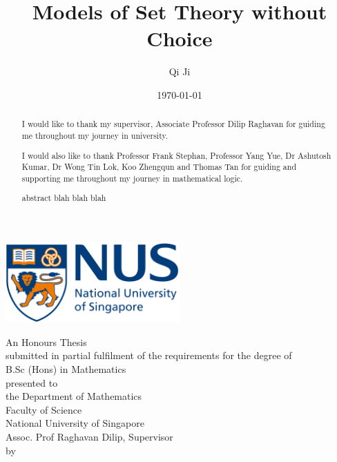 \documentclass[british,a4paper,12pt,abstract=on]{scrreprt}
\title{Models of Set Theory without Choice}
\author{Qi Ji}
\date{\today}
\makeatletter
\let\thetitle\@title
\let\theauthor\@author
\let\thedate\@date
\theoremstyle{definition}
\theoremstyle{remark}
\newcommand{\makecoverpage}{
    \begin{center}
        \includegraphics[width=0.5\textwidth]{nus_logo}
        \vspace*{3em}

        \begin{doublespace}
        {\huge \textbf{\thetitle}}
        \vspace*{5em}

        {An Honours Thesis \\ submitted in partial fulfilment of the requirements for
        the degree of \\ B.Sc (Hons) in Mathematics\\}
        \vspace*{3em}
        {presented to \\ the Department of Mathematics \\ Faculty of Science \\ National University of Singapore \\ Assoc. Prof Raghavan Dilip, Supervisor \\}
        \vspace*{3em}
        {by \\ \theauthor \\}
        \vspace*{3em}
        {\thedate}
        \end{doublespace}
    \end{center}
}
\newenvironment*{acknowledgements}{\renewcommand\abstractname{Acknowledgements}\begin{abstract}} {\end{abstract}}
\makeatother
\begin{document}
\let\setminus\smallsetminus
\let\epsilon\varepsilon
\let\phi\varphi
\begin{titlepage}
    \makecoverpage
\end{titlepage}
{}
\begin{acknowledgements}
    I would like to thank my supervisor, Associate Professor Dilip Raghavan for guiding me throughout my journey in university.

    I would also like to thank Professor Frank Stephan, Professor Yang Yue, Dr Ashutosh Kumar, Dr Wong Tin Lok, Koo Zhengqun and Thomas Tan for guiding and supporting me throughout my journey in mathematical logic.
\end{acknowledgements}

{}
\begin{abstract}
    abstract blah blah blah


\end{abstract}

\tableofcontents






\begin{onehalfspace}
    \printbibliography[heading=bibintoc,title={References}]
\end{onehalfspace}
\end{document}
